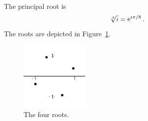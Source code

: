 {\begin{Solution}
\begin{enumerate}
\begin{align*}
    \end{align*}
    The principal root is
    \[
    \sqrt[4]{\imath} = \mathop{\mathrm{e}}\nolimits^{\imath \pi/8}.
    \]
    The roots are depicted in Figure~\ref{roots-i14}.
    \begin{figure}[h!]
      \begin{center}
        \includegraphics[width=0.3\textwidth]{fcv/number/roots-i14}
      \end{center}
      \caption{The four roots.}
      \label{roots-i14}
    \end{figure}
  \end{enumerate}  
\end{Solution}









}
